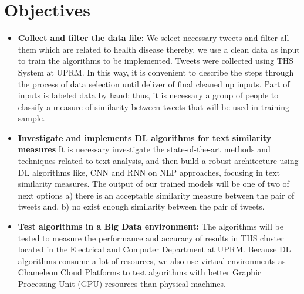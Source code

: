 \documentclass[12pt]{report}
\begin{document}
\section{Objectives}
\begin{itemize}[nolistsep]
	\item \textbf{Collect and filter the data file: } We select necessary tweets and filter all them which are related to health disease thereby, we use a clean data as input to train the algorithms to be implemented. Tweets were collected using \ac{THS} System at \ac{UPRM}. In this way, it is convenient to describe the steps through the process of data selection until deliver of final cleaned up inputs. Part of inputs is labeled data by hand; thus, it is necessary a group of people to classify a measure of similarity between tweets that will be used in training sample.
	\item \textbf{Investigate and implements \ac{DL} algorithms for text similarity measures} It is necessary investigate the state-of-the-art methods and techniques related to text analysis, and then build a robust architecture using \ac{DL} algorithms like, \ac{CNN} and \ac{RNN} on \ac{NLP} approaches,  focusing in text similarity measures. The output of our trained models will be one of two of next options a) there is an acceptable similarity measure between the pair of tweets and, b) no exist enough similarity between the pair of tweets.
	\item \textbf{Test algorithms in a Big Data environment: } The algorithms will be tested to measure the performance and accuracy of results in \ac{THS} cluster located in the Electrical and Computer Department at \ac{UPRM}. Because \ac{DL} algorithms consume a lot of resources, we also use virtual environments as Chameleon Cloud Platforms to test algorithms with better Graphic Processing Unit (GPU) resources than physical machines.
\end{itemize}
\end{document}
